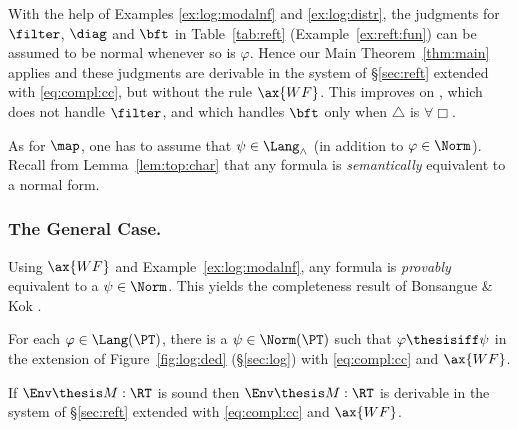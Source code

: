 With the help of Examples \ref{ex:log:modalnf} and \ref{ex:log:distr},
the judgments for $\filter$, $\diag$
and $\bft$ in Table~\ref{tab:reft} (Example~\ref{ex:reft:fun})
can be assumed to be normal whenever so is $\varphi$.
Hence our Main Theorem~\ref{thm:main} applies and these
judgments are derivable 
in the system of \S\ref{sec:reft} extended with \eqref{eq:compl:cc},
but without the rule $\ax{WF}$.
This improves on \cite{jr21esop},
which does not handle $\filter$,
and which handles $\bft$ only when $\triangle$ is $\forall\Box$.

As for $\map$,
one has to assume that $\psi \in \Lang_\land$ (in addition to $\varphi \in \Norm$).
Recall from Lemma~\ref{lem:top:char} that
any formula is \emph{semantically} equivalent to a normal form.

\subsubsection{The General Case.}
\label{sec:compl:general}
Using $\ax{WF}$ and Example~\ref{ex:log:modalnf},
any formula is \emph{provably} equivalent to a $\psi \in \Norm$.
This yields the completeness result of Bonsangue \& Kok \cite{bk03ic}.

\begin{lemma}
\label{lem:compl:nf:wf}
For each $\varphi \in \Lang(\PT)$, there is a $\psi \in \Norm(\PT)$
such that $\varphi \thesisiff \psi$
in the extension of Figure~\ref{fig:log:ded} (\S\ref{sec:log})
with \eqref{eq:compl:cc} and $\ax{WF}$.
\end{lemma}


\begin{corollary}[Bonsangue \& Kok \cite{bk03ic}]
If $\Env \thesis M : \RT$ is sound 
then $\Env \thesis M : \RT$ is derivable in the system of \S\ref{sec:reft}
extended with \eqref{eq:compl:cc} and $\ax{WF}$.
\end{corollary}




